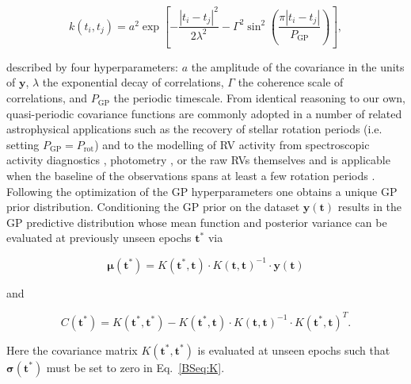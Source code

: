\begin{equation}
k(t_i,t_j) = a^2 \exp{\left[ - \frac{|t_i-t_j|^2}{2\lambda^2} -\Gamma^2
    \sin^2{\left(\frac{\pi|t_i-t_j|}{P_{\text{GP}}} \right)} \right]}, \label{cov}
\end{equation}

\noindent described by four hyperparameters: $a$ the amplitude of the covariance in the units of $\mathbf{y}$,
$\lambda$ the exponential decay of correlations, $\Gamma$ the coherence scale of correlations,
and $P_{\text{GP}}$ the periodic timescale. 
From identical reasoning to our own, quasi-periodic covariance functions are commonly adopted in a
number of related astrophysical applications such as the recovery of stellar rotation periods (i.e.
setting $P_{\text{GP}}=P_{\text{rot}}$) \citep[e.g.][]{angus18} and to the modelling of RV activity
from spectroscopic activity diagnostics \citep[e.g.][]{haywood14, rajpaul15, cloutier17b}, 
photometry \citep[e.g.][]{cloutier17a, cloutier17b}, or the raw RVs themselves
\citep[e.g.][]{faria16, donati17, yu17} and is applicable when the baseline of the
observations spans at least a few rotation periods \citep{pont13}. \\
 
Following the optimization of the GP hyperparameters one obtains a unique GP prior distribution. Conditioning
the GP prior on the dataset $\mathbf{y}(\mathbf{t})$ results in the GP predictive distribution whose mean function
and posterior variance can be evaluated at previously unseen epochs $\mathbf{t}^*$ via

\begin{equation}
  \boldsymbol{\mu}(\mathbf{t}^*) = K(\mathbf{t}^*,\mathbf{t}) \cdot K(\mathbf{t},\mathbf{t})^{-1} \cdot \mathbf{y}(\mathbf{t})
  \label{BSeq:GPmean}
\end{equation}

\noindent and 

\begin{equation}
  C(\mathbf{t}^*) = K(\mathbf{t}^*,\mathbf{t}^*) - K(\mathbf{t}^*,\mathbf{t}) \cdot K(\mathbf{t},\mathbf{t})^{-1} \cdot
  K(\mathbf{t}^*,\mathbf{t})^T.
  \label{BSeq:GPvar}
\end{equation}

\noindent Here the covariance matrix $K(\mathbf{t}^*,\mathbf{t}^*)$ is evaluated at unseen epochs such that
$\boldsymbol{\sigma}(\mathbf{t}^*)$ must be set to zero in Eq.~\ref{BSeq:K}.


